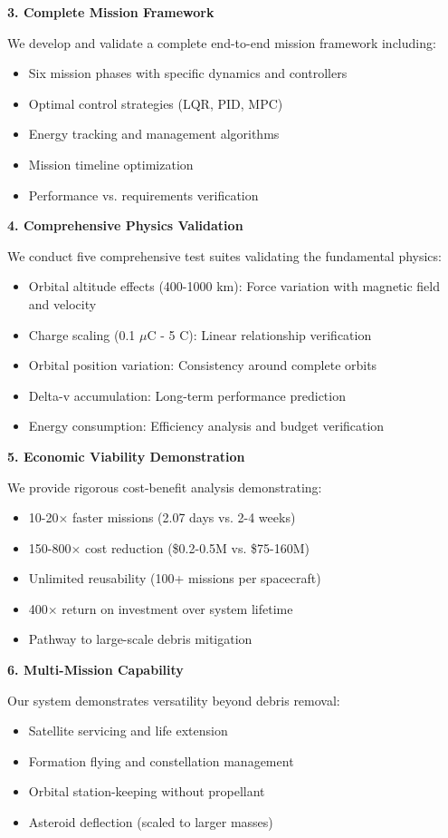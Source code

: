 \documentclass[12pt,a4paper]{article}
\begin{document}
\textbf{3. Complete Mission Framework}

We develop and validate a complete end-to-end mission framework including:
\begin{itemize}
\item Six mission phases with specific dynamics and controllers
\item Optimal control strategies (LQR, PID, MPC)
\item Energy tracking and management algorithms
\item Mission timeline optimization
\item Performance vs. requirements verification
\end{itemize}

\textbf{4. Comprehensive Physics Validation}

We conduct five comprehensive test suites validating the fundamental physics:
\begin{itemize}
\item Orbital altitude effects (400-1000 km): Force variation with magnetic field and velocity
\item Charge scaling (0.1 $\mu$C - 5 C): Linear relationship verification
\item Orbital position variation: Consistency around complete orbits
\item Delta-v accumulation: Long-term performance prediction
\item Energy consumption: Efficiency analysis and budget verification
\end{itemize}

\textbf{5. Economic Viability Demonstration}

We provide rigorous cost-benefit analysis demonstrating:
\begin{itemize}
\item 10-20$\times$ faster missions (2.07 days vs. 2-4 weeks)
\item 150-800$\times$ cost reduction (\$0.2-0.5M vs. \$75-160M)
\item Unlimited reusability (100+ missions per spacecraft)
\item 400$\times$ return on investment over system lifetime
\item Pathway to large-scale debris mitigation
\end{itemize}

\textbf{6. Multi-Mission Capability}

Our system demonstrates versatility beyond debris removal:
\begin{itemize}
\item Satellite servicing and life extension
\item Formation flying and constellation management
\item Orbital station-keeping without propellant
\item Asteroid deflection (scaled to larger masses)
\end{itemize}
\end{document}
